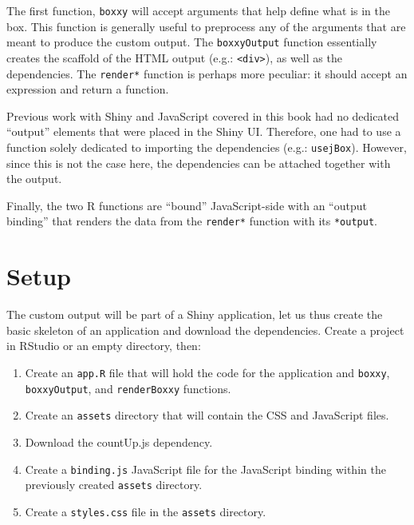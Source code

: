 \documentclass[10pt,]{krantz}
\providecommand{\tightlist}{%
  \setlength{\itemsep}{0pt}\setlength{\parskip}{0pt}}
\begin{document}
The first function, \texttt{boxxy} will accept arguments that help define what is in the box. This function is generally useful to preprocess any of the arguments that are meant to produce the custom output. The \texttt{boxxyOutput} function essentially creates the scaffold of the HTML output (e.g.: \texttt{\textless{}div\textgreater{}}), as well as the dependencies. The \texttt{render*} function is perhaps more peculiar: it should accept an expression and return a function.

Previous work with Shiny and JavaScript covered in this book had no dedicated ``output'' elements that were placed in the Shiny UI. Therefore, one had to use a function solely dedicated to importing the dependencies (e.g.: \texttt{usejBox}). However, since this is not the case here, the dependencies can be attached together with the output.

Finally, the two R functions are ``bound'' JavaScript-side with an ``output binding'' that renders the data from the \texttt{render*} function with its \texttt{*output}.

\hypertarget{shiny-output-setup}{%
\section{Setup}\label{shiny-output-setup}}

The custom output will be part of a Shiny application, let us thus create the basic skeleton of an application and download the dependencies. Create a project in RStudio or an empty directory, then:

\begin{enumerate}
\def\labelenumi{\arabic{enumi}.}
\tightlist
\item
  Create an \texttt{app.R} file that will hold the code for the application and \texttt{boxxy}, \texttt{boxxyOutput}, and \texttt{renderBoxxy} functions.
\item
  Create an \texttt{assets} directory that will contain the CSS and JavaScript files.
\item
  Download the countUp.js dependency.
\item
  Create a \texttt{binding.js} JavaScript file for the JavaScript binding within the previously created \texttt{assets} directory.
\item
  Create a \texttt{styles.css} file in the \texttt{assets} directory.
\end{enumerate}
\end{document}
